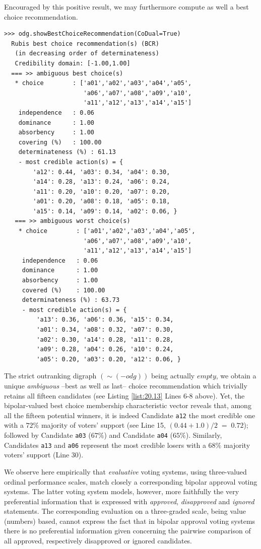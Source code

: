 Encouraged by this positive result, we may furthermore compute as well a best choice recommendation.
\begin{lstlisting}[caption={Computing a best social choice recommendation},label=list:20.13]
>>> odg.showBestChoiceRecommendation(CoDual=True)
  Rubis best choice recommendation(s) (BCR)
   (in decreasing order of determinateness)   
   Credibility domain: [-1.00,1.00]
  === >> ambiguous best choice(s) 
   * choice        : ['a01','a02','a03','a04','a05',
                      'a06','a07','a08','a09','a10',
                      'a11','a12','a13','a14','a15']
    independence   : 0.06
    dominance      : 1.00
    absorbency     : 1.00
    covering (%)   : 100.00
    determinateness (%) : 61.13
    - most credible action(s) = {
        'a12': 0.44, 'a03': 0.34, 'a04': 0.30,
        'a14': 0.28, 'a13': 0.24, 'a06': 0.24,
        'a11': 0.20, 'a10': 0.20, 'a07': 0.20,
        'a01': 0.20, 'a08': 0.18, 'a05': 0.18,
        'a15': 0.14, 'a09': 0.14, 'a02': 0.06, }
   === >> ambiguous worst choice(s)
    * choice        : ['a01','a02','a03','a04','a05',
                      'a06','a07','a08','a09','a10',
                      'a11','a12','a13','a14','a15']
     independence   : 0.06
     dominance      : 1.00
     absorbency     : 1.00
     covered (%)    : 100.00
     determinateness (%) : 63.73
     - most credible action(s) = {
         'a13': 0.36, 'a06': 0.36, 'a15': 0.34,
         'a01': 0.34, 'a08': 0.32, 'a07': 0.30,
         'a02': 0.30, 'a14': 0.28, 'a11': 0.28,
         'a09': 0.28, 'a04': 0.26, 'a10': 0.24,
         'a05': 0.20, 'a03': 0.20, 'a12': 0.06, }
\end{lstlisting}
The strict outranking digraph $(\sim (-odg))$ being actually $empty$, we obtain a unique \emph{ambiguous} --best as well as last-- choice recommendation which trivially retains all fifteen candidates (see Listing \ref{list:20.13} Lines 6-8 above). Yet, the bipolar-valued best choice membership characteristic vector reveals that, among all the fifteen potential winners, it is indeed Candidate \texttt{a12} the most credible one with a $72\%$ majority of voters' support (see Line 15, $(0.44 + 1.0)/2\;=\; 0.72$); followed by Candidate \texttt{a03} ($67\%$) and Candidate \texttt{a04} ($65\%$). Similarly, Candidates \texttt{a13} and \texttt{a06} represent the most credible losers with a $68\%$ majority voters' support (Line 30).

We observe here empirically that \emph{evaluative} voting systems, using three-valued ordinal performance scales, match closely a corresponding bipolar approval voting systems. The latter voting system models, however, more faithfully the very preferential information that is expressed with \emph{approved}, \emph{disapproved} and \emph{ignored} statements. The corresponding evaluation on a three-graded scale, being value (numbers) based, cannot express the fact that in bipolar approval voting systems there is no preferential information given concerning the pairwise comparison of all approved, respectively disapproved or ignored candidates.

